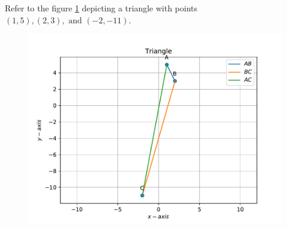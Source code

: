 \documentclass[12pt]{article}
\begin{document}
\begin{enumerate}
Refer to the figure \ref{fig:Fig1} depicting a triangle with points $(1,5), (2,3), \text{ and } (-2,-11)$. \\ 
\begin{figure}[!h]
	\begin{center}
		\includegraphics[width=\columnwidth]{./figs/problem3.pdf}
	\end{center}
\caption{}
\label{fig:Fig1}
\end{figure}

\end{enumerate}
\end{document}
